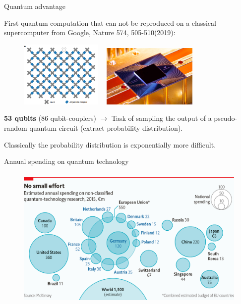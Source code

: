 \documentclass[aspectratio=169, 8pt, xcolor={svgnames}, hyperref={linkcolor=black}]{beamer}
\begin{document}
\begin{frame}{Quantum advantage}

   First quantum computation that can not be reproduced on a classical
   supercomputer from Google, {\color{magenta}Nature 574, 505-510(2019)}:

   \begin{figure}
     \includegraphics[height=3.2cm]{figures/q3.png}%
     $\quad$\includegraphics[height=3cm]{figures/q2.png}
   \end{figure}

   \textbf{53 qubits} (86 qubit-couplers) $\rightarrow$ Task of sampling the
   output of a pseudo-random quantum circuit (extract probability
   distribution).

   Classically the probability distribution is {\color{blue}exponentially more difficult}.

 \end{frame}

 \begin{frame}[fragile]{Annual spending on quantum technology}

     \begin{figure}
         \includegraphics[height=7cm]{figures/20170311_01_DESKTOP.png}
     \end{figure}

 \end{frame}
\end{document}
